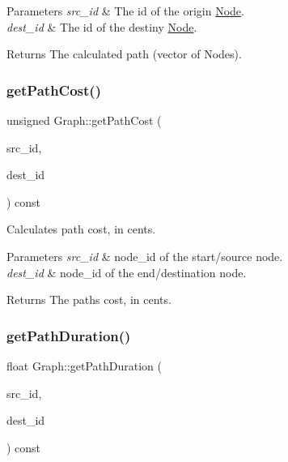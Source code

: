 \begin{DoxyParams}{Parameters}
{\em src\+\_\+id} & The id of the origin \hyperlink{class_node}{Node}. \\
\hline
{\em dest\+\_\+id} & The id of the destiny \hyperlink{class_node}{Node}.\\
\hline
\end{DoxyParams}
\begin{DoxyReturn}{Returns}
The calculated path (vector of Nodes). 
\end{DoxyReturn}
\hypertarget{class_graph_a9d5ab1a266d948f146e78866ef19673d}{}\label{class_graph_a9d5ab1a266d948f146e78866ef19673d} 
\subsubsection{\texorpdfstring{get\+Path\+Cost()}{getPathCost()}}
{\footnotesize\ttfamily unsigned Graph\+::get\+Path\+Cost (\begin{DoxyParamCaption}\item[{\hyperlink{_node_8hpp_a9d6265804805c2375068fd7484840dc6}{node\+\_\+id}}]{src\+\_\+id,  }\item[{\hyperlink{_node_8hpp_a9d6265804805c2375068fd7484840dc6}{node\+\_\+id}}]{dest\+\_\+id }\end{DoxyParamCaption}) const}

Calculates path cost, in cents.


\begin{DoxyParams}{Parameters}
{\em src\+\_\+id} & node\+\_\+id of the start/source node. \\
\hline
{\em dest\+\_\+id} & node\+\_\+id of the end/destination node.\\
\hline
\end{DoxyParams}
\begin{DoxyReturn}{Returns}
The path\textquotesingle{}s cost, in cents. 
\end{DoxyReturn}
\hypertarget{class_graph_a2d69a99fb35fee10aadc243c468ad9b2}{}\label{class_graph_a2d69a99fb35fee10aadc243c468ad9b2} 
\subsubsection{\texorpdfstring{get\+Path\+Duration()}{getPathDuration()}}
{\footnotesize\ttfamily float Graph\+::get\+Path\+Duration (\begin{DoxyParamCaption}\item[{\hyperlink{_node_8hpp_a9d6265804805c2375068fd7484840dc6}{node\+\_\+id}}]{src\+\_\+id,  }\item[{\hyperlink{_node_8hpp_a9d6265804805c2375068fd7484840dc6}{node\+\_\+id}}]{dest\+\_\+id }\end{DoxyParamCaption}) const}

